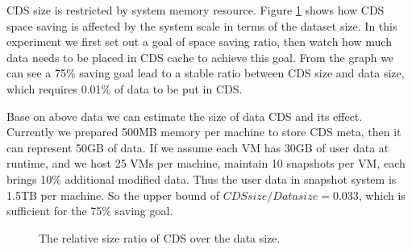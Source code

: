 CDS size is restricted by system memory resource.
Figure \ref{fig:datacds} shows how CDS space saving is affected by the system scale in terms of
the dataset size. 
In this experiment we first set out a goal of space saving ratio, 
then watch how much data needs to be placed in CDS cache to achieve this goal.
From the graph we can see a 75\% saving goal lead to a stable ratio between 
CDS size and data size, which requires 0.01\% of data to be put in CDS.

Base on above data we can estimate the size of data CDS and its effect. 
Currently we prepared 500MB memory per machine to store CDS meta, then it can represent 50GB of data. 
If we assume each VM has 30GB of user data at runtime, and we host 25 VMs per machine, 
 maintain 10 snapshots per VM, each brings 10\% additional modified data. 
Thus the user data in snapshot system is 1.5TB per machine. So the upper bound of 
$CDS size/ Data size = 0.033$, which is sufficient for the 75\% saving goal.

\begin{figure}
  \centering
  \caption{The relative size ratio of  CDS over the data size. }
  \label{fig:datacds}
\end{figure}

